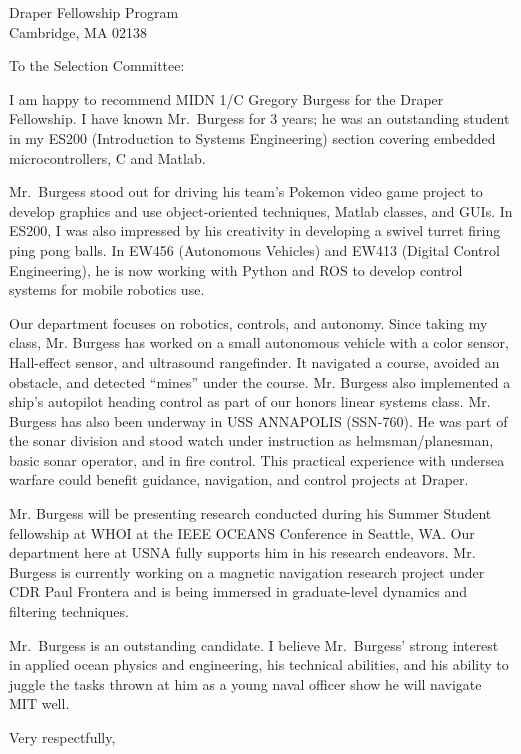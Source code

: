 \documentclass[12pt]{wrceletter}
\date{\today}
\begin{document}
\begin{letter}{%
Draper Fellowship Program\\
Cambridge, MA 02138}

\opening{To the Selection Committee:}
\raggedright %
\setlength{\parindent}{15pt} %

I am happy to recommend MIDN 1/C Gregory Burgess for the Draper Fellowship. I have known Mr.~Burgess for 3 years; he was an outstanding student in my ES200 (Introduction to Systems Engineering) section covering embedded microcontrollers, C and Matlab. 

Mr.~Burgess stood out for driving his team's Pokemon video game project to develop graphics and use object-oriented techniques, Matlab classes, and GUIs. In ES200, I was also impressed by his creativity in developing a swivel turret firing ping pong balls. In EW456 (Autonomous Vehicles) and EW413 (Digital Control Engineering), he is now working with Python and ROS to develop control systems for mobile robotics use.

Our department focuses on robotics, controls, and autonomy. Since taking my class, Mr. Burgess has worked on a small autonomous vehicle with a color sensor, Hall-effect sensor, and ultrasound rangefinder. It navigated a course, avoided an obstacle, and detected ``mines'' under the course. Mr. Burgess also implemented a ship’s autopilot heading control as part of our honors linear systems class. Mr. Burgess has also been underway in USS ANNAPOLIS (SSN-760). He was part of the sonar division and stood watch under instruction as helmsman/planesman, basic sonar operator, and in fire control. This practical experience with undersea warfare could benefit guidance, navigation, and control projects at Draper.

Mr. Burgess will be presenting research conducted during his Summer Student fellowship at WHOI at the IEEE OCEANS Conference in Seattle, WA. Our department here at USNA fully supports him in his research endeavors. Mr. Burgess is currently working on a magnetic navigation research project under CDR Paul Frontera and is being immersed in graduate-level dynamics and filtering techniques. 

Mr.~Burgess is an outstanding candidate. I believe Mr.~Burgess' strong interest in applied ocean physics and engineering, his technical abilities, and his ability to juggle the tasks thrown at him as a young naval officer show he will navigate MIT well. 

\closing{Very respectfully,} %

\end{letter}
\end{document}
